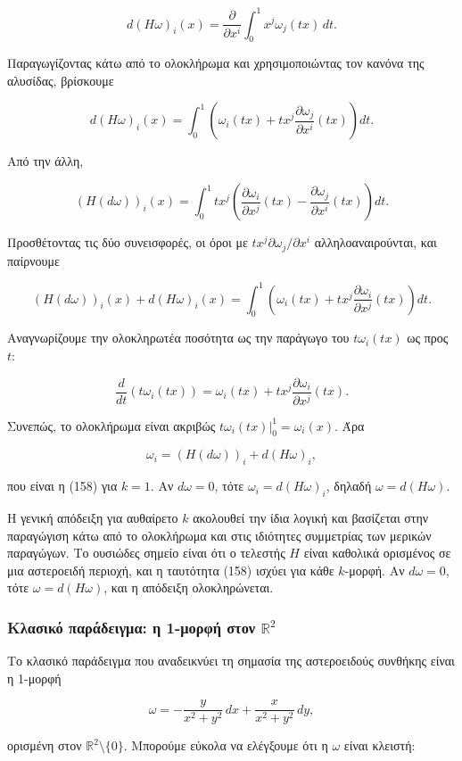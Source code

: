 \documentclass[12pt]{article}
\begin{document}
\[
d(H\omega)_i(x) = \frac{\partial}{\partial x^i} \int_0^1 x^j \omega_j(tx) \, dt.
\]

Παραγωγίζοντας κάτω από το ολοκλήρωμα και χρησιμοποιώντας τον κανόνα της αλυσίδας, βρίσκουμε

\[
d(H\omega)_i(x) = \int_0^1 \left( \omega_i(tx) + t x^j \frac{\partial \omega_j}{\partial x^i}(tx) \right) dt.
\]

Από την άλλη,

\[
(H(d\omega))_i(x) = \int_0^1 t x^j \left( \frac{\partial \omega_i}{\partial x^j}(tx) - \frac{\partial \omega_j}{\partial x^i}(tx) \right) dt.
\]

Προσθέτοντας τις δύο συνεισφορές, οι όροι με $t x^j \partial \omega_j / \partial x^i$ αλληλοαναιρούνται, και παίρνουμε

\[
(H(d\omega))_i(x) + d(H\omega)_i(x) = \int_0^1 \left( \omega_i(tx) + t x^j \frac{\partial \omega_i}{\partial x^j}(tx) \right) dt.
\]

Αναγνωρίζουμε την ολοκληρωτέα ποσότητα ως την παράγωγο του $t \omega_i(tx)$ ως προς $t$:

\[
\frac{d}{dt} \left( t \omega_i(tx) \right) = \omega_i(tx) + t x^j \frac{\partial \omega_i}{\partial x^j}(tx).
\]

Συνεπώς, το ολοκλήρωμα είναι ακριβώς $t \omega_i(tx) \big|_0^1 = \omega_i(x)$. Άρα

\[
\omega_i = (H(d\omega))_i + d(H\omega)_i,
\]

που είναι η (158) για $k=1$. Αν $d\omega = 0$, τότε $\omega_i = d(H\omega)_i$, δηλαδή $\omega = d(H\omega)$.

Η γενική απόδειξη για αυθαίρετο $k$ ακολουθεί την ίδια λογική και βασίζεται στην παραγώγιση κάτω από το ολοκλήρωμα και στις ιδιότητες συμμετρίας των μερικών παραγώγων. Το ουσιώδες σημείο είναι ότι ο τελεστής $H$ είναι καθολικά ορισμένος σε μια αστεροειδή περιοχή, και η ταυτότητα (158) ισχύει για κάθε $k$-μορφή. Αν $d\omega = 0$, τότε $\omega = d(H\omega)$, και η απόδειξη ολοκληρώνεται.

\subsubsection{Κλασικό παράδειγμα: η 1-μορφή στον $\mathbb{R}^2$}

Το κλασικό παράδειγμα που αναδεικνύει τη σημασία της αστεροειδούς συνθήκης είναι η 1-μορφή

\[
\omega = -\frac{y}{x^2 + y^2} \, dx + \frac{x}{x^2 + y^2} \, dy,
\]

ορισμένη στον $\mathbb{R}^2 \setminus \{0\}$. Μπορούμε εύκολα να ελέγξουμε ότι η $\omega$ είναι κλειστή:
\end{document}
